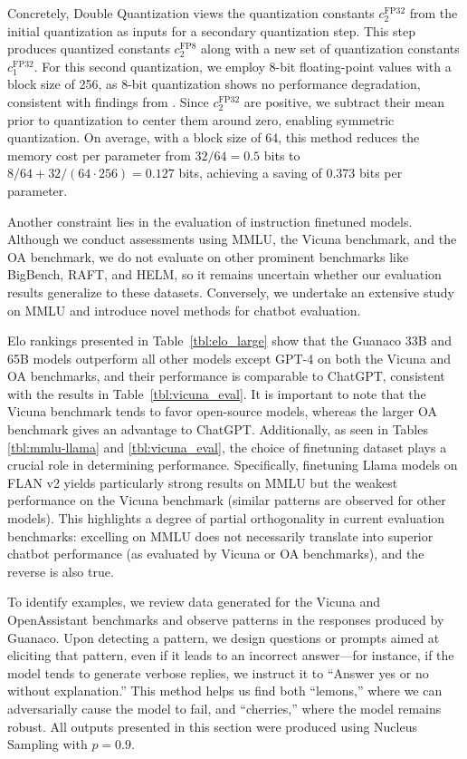 Concretely, Double Quantization views the quantization constants $c_2^{\text{FP32}}$ from the initial quantization as inputs for a secondary quantization step. This step produces quantized constants $c_2^{\text{FP8}}$ along with a new set of quantization constants $c_1^{\text{FP32}}$. For this second quantization, we employ 8-bit floating-point values with a block size of 256, as 8-bit quantization shows no performance degradation, consistent with findings from \citet{dettmers2022case}. Since $c_2^{\text{FP32}}$ are positive, we subtract their mean prior to quantization to center them around zero, enabling symmetric quantization. On average, with a block size of 64, this method reduces the memory cost per parameter from $32/64=0.5$ bits to $8/64 + 32/(64\cdot256) = 0.127$ bits, achieving a saving of 0.373 bits per parameter.

Another constraint lies in the evaluation of instruction finetuned models. Although we conduct assessments using MMLU, the Vicuna benchmark, and the OA benchmark, we do not evaluate on other prominent benchmarks like BigBench, RAFT, and HELM, so it remains uncertain whether our evaluation results generalize to these datasets. Conversely, we undertake an extensive study on MMLU and introduce novel methods for chatbot evaluation.

Elo rankings presented in Table~\ref{tbl:elo_large} show that the {Guanaco} 33B and 65B models outperform all other models except GPT-4 on both the Vicuna and OA benchmarks, and their performance is comparable to ChatGPT, consistent with the results in Table~\ref{tbl:vicuna_eval}. It is important to note that the Vicuna benchmark tends to favor open-source models, whereas the larger OA benchmark gives an advantage to ChatGPT. Additionally, as seen in Tables \ref{tbl:mmlu-llama} and \ref{tbl:vicuna_eval}, the choice of finetuning dataset plays a crucial role in determining performance. Specifically, finetuning Llama models on FLAN v2 yields particularly strong results on MMLU but the weakest performance on the Vicuna benchmark (similar patterns are observed for other models). This highlights a degree of partial orthogonality in current evaluation benchmarks: excelling on MMLU does not necessarily translate into superior chatbot performance (as evaluated by Vicuna or OA benchmarks), and the reverse is also true.

To identify examples, we review data generated for the Vicuna and OpenAssistant benchmarks and observe patterns in the responses produced by {Guanaco}. Upon detecting a pattern, we design questions or prompts aimed at eliciting that pattern, even if it leads to an incorrect answer—for instance, if the model tends to generate verbose replies, we instruct it to ``Answer yes or no without explanation.'' This method helps us find both ``lemons,'' where we can adversarially cause the model to fail, and ``cherries,'' where the model remains robust. All outputs presented in this section were produced using Nucleus Sampling \cite{holtzmancurious} with $p=0.9$.

